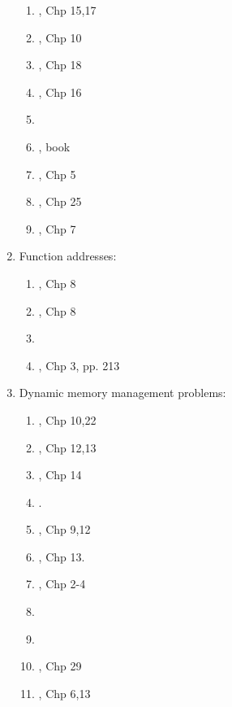 \begin{enumerate}
	\begin{enumerate} \itemsep -2pt
	\item \cite{Gregoire2014}, Chp 15,17
	\item \cite{Lippman2013}, Chp 10
	\item \cite{Allain2012}, Chp 18
	\item \cite{Prata2012}, Chp 16
	\item \cite[\S18.3, pp. 977-991]{Savitch2009}
	\item \cite{Reese2006a}, book
	\item \cite{Eckel2003}, Chp 5
	\item \cite{Oualline2003}, Chp 25
	\item \cite{Vermeir2001}, Chp 7
	\end{enumerate}
\item Function addresses: \vspace{-0.3cm}
	\begin{enumerate} \itemsep -2pt
	\item \cite{Stroustrup2014}, Chp 8
	\item \cite{Stroustrup2009}, Chp 8
	\item \cite[pp. 330--331]{Prata2005}
	\item \cite{Eckel2000}, Chp 3, pp. 213
	\end{enumerate}
\item Dynamic memory management problems: \vspace{-0.3cm}
	\begin{enumerate} \itemsep -2pt
	\item \cite{Gregoire2014}, Chp 10,22
	\item \cite{Lippman2013}, Chp 12,13
	\item \cite{Allain2012}, Chp 14
	\item \cite[\S13.9, 750--754]{Gaddis2012}.
	\item \cite{Prata2012}, Chp 9,12
	\item \cite{Gaddis2010}, Chp 13.
	\item \cite{Meyers2005}, Chp 2-4
	\item \cite[Chp. 9, pp. 393--423; Chp. 12, pp. 562--606; Chp. 13, pp. 677--685]{Prata2005}
	\item \cite[\S3.1; \S8.1]{Romanik2003}
	\item \cite{Schildt2003}, Chp 29
	\item \cite{Eckel2000}, Chp 6,13

\end{enumerate}
\end{enumerate}
